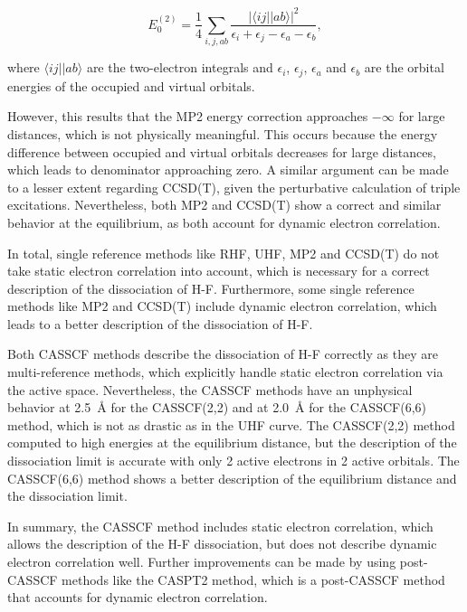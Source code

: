 \documentclass[fontsize=11pt,a4paper,oneside]{scrartcl}
\begin{document}
\begin{equation}
        E_0^{(2)}= \frac{1}{4} \sum_{i,j,ab} \frac{| \langle ij || ab \rangle| ^2 }{\epsilon_i + \epsilon_j - \epsilon_a - \epsilon_b},
        \label{eq:mp2_energy}
\end{equation}

where $\langle ij || ab \rangle$ are the two-electron integrals and $\epsilon_i$, $\epsilon_j$, $\epsilon_a$ and $\epsilon_b$ are the orbital energies of the occupied and virtual orbitals.

However, this results that the \ac{MP2} energy correction approaches $- \infty$ for large distances, which is not physically meaningful. This occurs because the energy difference between occupied and virtual orbitals decreases for large distances, which leads to denominator approaching zero. A similar argument can be made to a lesser extent regarding \ac{CCSD(T)}, given the perturbative calculation of triple excitations. Nevertheless, both \ac{MP2} and \ac{CCSD(T)} show a correct and similar behavior at the equilibrium, as both account for dynamic electron correlation.

In total, single reference methods like \ac{RHF}, \ac{UHF}, \ac{MP2} and \ac{CCSD(T)} do not take static electron correlation into account, which is necessary for a correct description of the dissociation of H-F. Furthermore, some single reference methods like \ac{MP2} and \ac{CCSD(T)} include dynamic electron correlation, which leads to a better description of the dissociation of H-F.

Both \ac{CASSCF} methods describe the dissociation of H-F correctly as they are multi-reference methods, which explicitly handle static electron correlation via the active space. Nevertheless, the \ac{CASSCF} methods have an unphysical behavior at 2.5~\AA{} for the \ac{CASSCF}(2,2) and at 2.0~\AA{} for the \ac{CASSCF}(6,6) method, which is not as drastic as in the \ac{UHF} curve. The \ac{CASSCF}(2,2) method computed to high energies at the equilibrium distance, but the description of the dissociation limit is accurate with only 2 active electrons in 2 active orbitals. The \ac{CASSCF}(6,6) method shows a better description of the equilibrium distance and the dissociation limit. 

In summary, the \ac{CASSCF} method includes static electron correlation, which allows the description of the H-F dissociation, but does not describe dynamic electron correlation well. Further improvements can be made by using post-\ac{CASSCF} methods like the \ac{CASPT2} method, which is a post-\ac{CASSCF} method that accounts for dynamic electron correlation.
\end{document}
